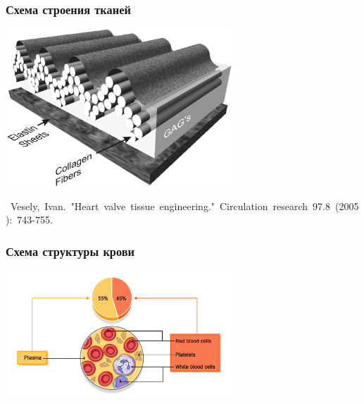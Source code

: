 \documentclass[14pt]{beamer}
\begin{document}
\begin{frame}
\frametitle{Схема строения тканей}
    \begin{center}
        \includegraphics[width=8.5cm]{valve_tissue_structure.jpg}
    \end{center}

    \begin{spacing}{0.5}
        \mbox{\scriptsize
            Vesely, Ivan. "Heart valve tissue engineering." Circulation research 97.8 (2005): 743-755.
        }
    \end{spacing}

\end{frame}

\begin{frame}
\frametitle{Схема структуры крови}
    \begin{center}
        \includegraphics[width=8.5cm]{blood_scheme.png}
    \end{center}
\end{frame}
\end{document}
